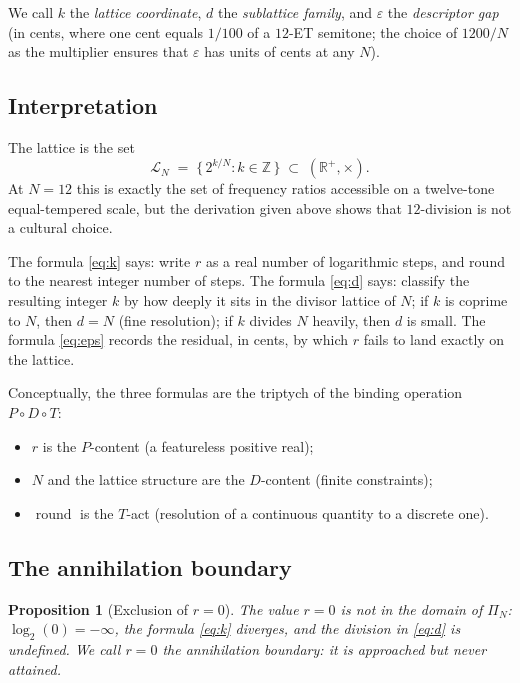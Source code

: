 \documentclass[11pt,a4paper]{article}
\newtheorem{proposition}[theorem]{Proposition}
\theoremstyle{definition}
\theoremstyle{remark}
\newcommand{\R}{\mathbb{R}}
\newcommand{\Z}{\mathbb{Z}}
\DeclareMathOperator{\round}{round}
\newcommand{\eps}{\varepsilon}
\begin{document}
We call $k$ the \emph{lattice coordinate}, $d$ the \emph{sublattice family}, and $\eps$ the \emph{descriptor gap} (in cents, where one cent equals $1/100$ of a $12$-ET semitone; the choice of $1200/N$ as the multiplier ensures that $\eps$ has units of cents at any $N$).

\subsection{Interpretation}

The lattice is the set
\[
\mathcal{L}_{N} \;=\; \bigl\{\,2^{k/N} : k\in\Z\,\bigr\} \;\subset\; (\R^{+},\times).
\]
At $N=12$ this is exactly the set of frequency ratios accessible on a twelve-tone equal-tempered scale, but the derivation given above shows that $12$-division is not a cultural choice.

The formula \eqref{eq:k} says: write $r$ as a real number of logarithmic steps, and round to the nearest integer number of steps. The formula \eqref{eq:d} says: classify the resulting integer $k$ by how deeply it sits in the divisor lattice of $N$; if $k$ is coprime to $N$, then $d=N$ (fine resolution); if $k$ divides $N$ heavily, then $d$ is small. The formula \eqref{eq:eps} records the residual, in cents, by which $r$ fails to land exactly on the lattice.

Conceptually, the three formulas are the triptych of the binding operation $P\circ D\circ T$:
\begin{itemize}[leftmargin=*]
\item $r$ is the $P$-content (a featureless positive real);
\item $N$ and the lattice structure are the $D$-content (finite constraints);
\item $\round$ is the $T$-act (resolution of a continuous quantity to a discrete one).
\end{itemize}

\subsection{The annihilation boundary}

\begin{proposition}[Exclusion of $r=0$]\label{prop:zero}
The value $r=0$ is not in the domain of $\Pi_{N}$: $\log_{2}(0)=-\infty$, the formula \eqref{eq:k} diverges, and the division in \eqref{eq:d} is undefined. We call $r=0$ the \emph{annihilation boundary}: it is approached but never attained.
\end{proposition}
\end{document}
